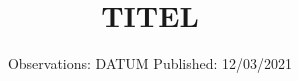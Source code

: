 

\subject{VERSUCH NUMMER}
\title{TITEL}
\date{%
  Observations: DATUM
  \hspace{3em}
  Published: 12/03/2021
}



\maketitle
\thispagestyle{empty}
\tableofcontents
\newpage







\printbibliography{}


